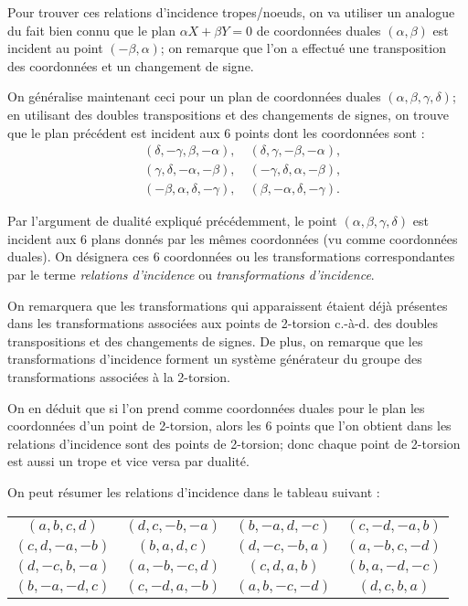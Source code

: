 \documentclass[a4paper]{article}
\theoremstyle{definition}
\theoremstyle{remark}
\numberwithin{equation}{section}
\begin{document}
Pour trouver ces relations d'incidence tropes/noeuds, on va utiliser un analogue du fait bien connu que le plan $\alpha X + \beta Y=0$ de coordonnées duales $(\alpha,\beta)$ est incident au point $(-\beta, \alpha)$; on remarque que l'on a effectué une transposition des coordonnées et un changement de signe.

On généralise maintenant ceci pour un plan de coordonnées duales $(\alpha, \beta, \gamma, \delta)$; en utilisant des doubles transpositions et des changements de signes, on trouve que le plan précédent est incident aux 6 points dont les coordonnées sont :
\begin{align*}
   &(\delta, -\gamma, \beta, -\alpha), \quad (\delta, \gamma, -\beta, -\alpha), \\
   &(\gamma, \delta, -\alpha, -\beta), \quad (-\gamma, \delta, \alpha, -\beta), \\
   &(-\beta, \alpha, \delta, -\gamma), \quad (\beta, -\alpha, \delta, -\gamma).
\end{align*}

Par l'argument de dualité expliqué précédemment, le point $(\alpha, \beta, \gamma, \delta)$ est incident aux 6 plans donnés par les mêmes coordonnées (vu comme coordonnées duales).
On désignera ces 6 coordonnées ou les transformations correspondantes par le terme \emph{relations d'incidence} ou \emph{transformations d'incidence}.

On remarquera que les transformations qui apparaissent étaient déjà présentes dans les transformations associées aux points de 2-torsion c.-à-d. des doubles transpositions et des changements de signes. De plus, on remarque que les transformations d'incidence forment un système générateur du groupe des transformations associées à la 2-torsion.

On en déduit que si l'on prend comme coordonnées duales pour le plan les coordonnées d'un point de 2-torsion, alors les 6 points que l'on obtient dans les relations d'incidence sont des points de 2-torsion; donc chaque point de 2-torsion est aussi un trope et vice versa par dualité.

On peut résumer les relations d'incidence dans le tableau suivant :
\begin{center}
\begin{tabular}{ c c c c }
   $(a,b,c,d)$   & $(d,c,-b,-a)$ & $(b,-a,d,-c)$ & $(c,-d,-a,b)$ \\
   $(c,d,-a,-b)$ & $(b,a,d,c)$ & $(d,-c,-b,a)$ & $(a,-b,c,-d)$ \\
   $(d,-c,b,-a)$ & $(a,-b,-c,d)$ & $(c,d,a,b)$ & $(b,a,-d,-c)$ \\
   $(b,-a,-d,c)$ &  $(c,-d,a,-b)$ & $(a,b,-c,-d)$ & $(d, c, b, a)$
 \end{tabular}
\end{center}
\end{document}
